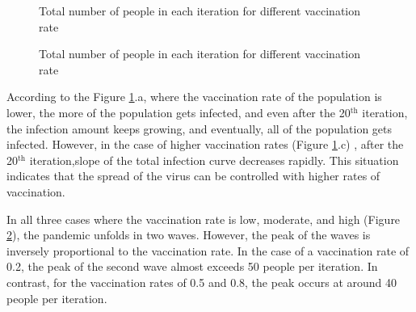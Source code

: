 \documentclass{article}
\begin{document}
\begin{figure}[h]
    \centering
    \qquad
    \qquad
    \caption{Total number of people in each iteration for different vaccination rate}
    \label{fig:AlterDelta3SC2all}%
\end{figure}
\begin{figure}
    \centering
    \qquad
    \qquad
    \caption{Total number of people in each iteration for different vaccination rate}
    \label{fig:AlterDelta3SC2perIter}%
\end{figure}


According to the Figure \ref{fig:AlterDelta3SC2all}.a, where the vaccination rate of the population is lower, the more of the population gets infected, and even after the 20$^{\textrm{th}}$ iteration, the infection amount keeps growing, and eventually, all of the population gets infected. However, in the case of higher vaccination rates (Figure \ref{fig:AlterDelta3SC2all}.c) , after the 20$^{\textrm{th}}$ iteration,slope of the total infection curve decreases rapidly. This situation indicates that the spread of the virus can be controlled with higher rates of vaccination.

In all three cases where the vaccination rate is low, moderate, and high (Figure \ref{fig:AlterDelta3SC2perIter}), the pandemic unfolds in two waves. However, the peak of the waves is inversely proportional to the vaccination rate. In the case of a vaccination rate of 0.2, the peak of the second wave almost exceeds 50 people per iteration. In contrast, for the vaccination rates of 0.5 and 0.8, the peak occurs at around 40 people per iteration.
\end{document}
